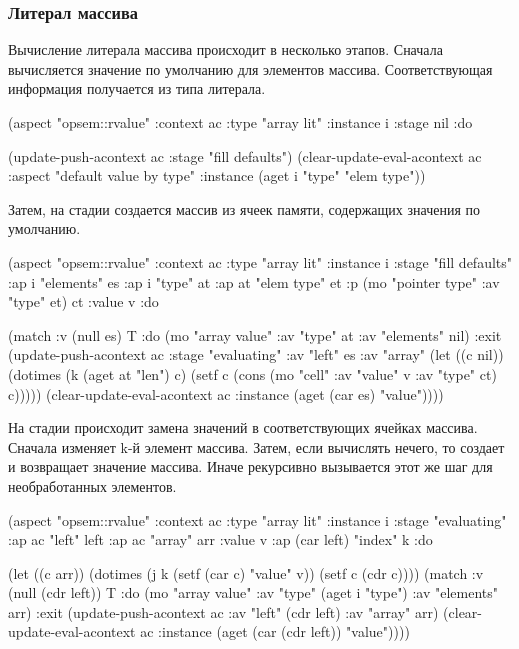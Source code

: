 \documentclass[12pt,twoside,russian]{article}
\newcommand{\textABMLString}[1]{{\color{abmlString}#1}}
\newcommand{\ABMLString}[1]{\abmlinline{\textABMLString{#1}}}
\begin{document}
\subsubsection{Литерал массива}
Вычисление литерала массива происходит в несколько этапов. Сначала вычисляется значение по умолчанию для элементов массива. Соответствующая информация получается из типа литерала.

\begin{ABMLCode}
(aspect "opsem::rvalue" :context ac :type "array lit" :instance i 
  :stage nil :do 
    
  (update-push-acontext ac :stage "fill defaults")
  (clear-update-eval-acontext ac :aspect "default value by type" 
    :instance (aget i "type" "elem type"))
\end{ABMLCode}

Затем, на стадии \ABMLString{fill defaults} создается массив из ячеек памяти, содержащих значения по умолчанию.

\begin{ABMLCode}
(aspect "opsem::rvalue" :context ac :type "array lit" :instance i 
  :stage "fill defaults" :ap i "elements" es :ap i "type" at 
  :ap at "elem type" et :p (mo "pointer type" :av "type" et) ct 
  :value v :do 
	
  (match :v (null es) T 
  :do   (mo "array value" :av "type" at :av "elements" nil) 
  :exit (update-push-acontext ac :stage "evaluating" :av "left" es 
          :av "array" (let ((c nil)) 
          (dotimes (k (aget at "len") c) (setf c 
          (cons (mo "cell" :av "value" v :av "type" ct) c)))))
        (clear-update-eval-acontext ac 
          :instance (aget (car es) "value"))))
\end{ABMLCode}

На стадии \ABMLString{evaluating} происходит замена значений в соответствующих ячейках массива. Сначала изменяет k-й элемент массива. Затем, если вычислять нечего, то создает и возвращает значение массива. Иначе рекурсивно вызывается этот же шаг для необработанных элементов.

\begin{ABMLCode}
(aspect "opsem::rvalue" :context ac :type "array lit" :instance i 
  :stage "evaluating" :ap ac "left" left :ap ac "array" arr 
  :value v :ap (car left) "index" k :do 

  (let ((c arr)) (dotimes (j k (setf (car c) "value" v)) 
    (setf c (cdr c))))
  (match :v (null (cdr left)) T 
  :do (mo "array value" :av "type" (aget i "type") :av "elements" arr)
  :exit (update-push-acontext ac :av "left" (cdr left) 
          :av "array" arr)
        (clear-update-eval-acontext ac 
          :instance (aget (car (cdr left)) "value"))))
\end{ABMLCode}
\end{document}
